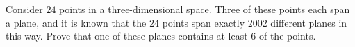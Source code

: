 Consider $24$ points in a three-dimensional space. Three of these points each span a plane,
and it is known that the $24$ points span exactly $2002$ different planes in this way.
Prove that one of these planes contains at least $6$ of the points.